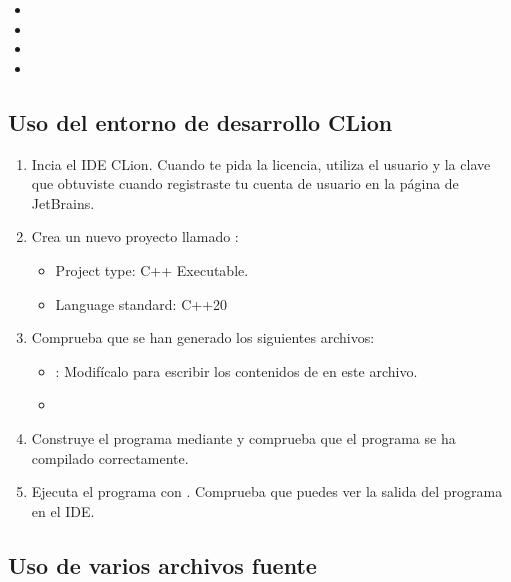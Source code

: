 \begin{itemize}
  \item {}
  \item {}
  \item {}
  \item {}
\end{itemize}

\subsection{Uso del entorno de desarrollo \textbf{CLion}}

\begin{enumerate}

\item
Incia el IDE CLion.
Cuando te pida la licencia, utiliza el usuario y la clave que obtuviste cuando
registraste tu cuenta de usuario en la página de JetBrains.

\item
Crea un nuevo proyecto llamado :

\begin{itemize}
  \item Project type: C++ Executable.
  \item Language standard: C++20
\end{itemize}

\item
Comprueba que se han generado los siguientes archivos:

\begin{itemize}
  \item {}: 
        Modifícalo para escribir los contenidos de  en este archivo.
  \item {}
\end{itemize}

\item
Construye el programa mediante  
y comprueba que el programa se ha compilado correctamente.

\item
Ejecuta el programa con . 
Comprueba que puedes ver la salida del programa en el IDE.

\end{enumerate}

\subsection{Uso de varios archivos fuente}

